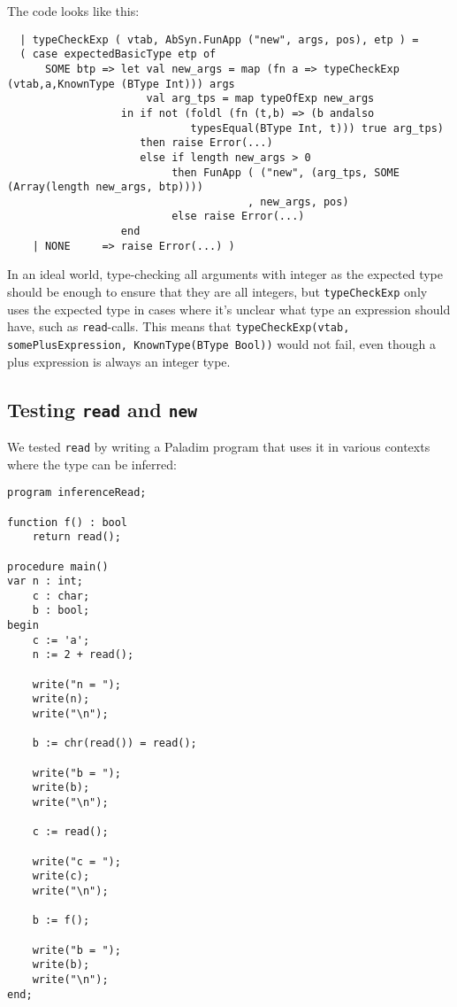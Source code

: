 \documentclass{article}
\begin{document}
The code looks like this:
\begin{lstlisting}
  | typeCheckExp ( vtab, AbSyn.FunApp ("new", args, pos), etp ) =
  ( case expectedBasicType etp of
      SOME btp => let val new_args = map (fn a => typeCheckExp (vtab,a,KnownType (BType Int))) args
                      val arg_tps = map typeOfExp new_args
                  in if not (foldl (fn (t,b) => (b andalso
                             typesEqual(BType Int, t))) true arg_tps)
                     then raise Error(...)
                     else if length new_args > 0
                          then FunApp ( ("new", (arg_tps, SOME (Array(length new_args, btp))))
                                      , new_args, pos)
                          else raise Error(...)
                  end
    | NONE     => raise Error(...) )
\end{lstlisting}

In an ideal world, type-checking all arguments with integer as the expected type should be enough to ensure that they are all integers, but \texttt{typeCheckExp} only uses the expected type in cases where it's unclear what type an expression should have, such as \texttt{read}-calls. This means that \texttt{typeCheckExp(vtab, somePlusExpression, KnownType(BType Bool))} would not fail, even though a plus expression is always an integer type.

\subsection{Testing \texttt{read} and \texttt{new}}
We tested \texttt{read} by writing a Paladim program that uses it in various contexts where the type can be inferred:

\begin{lstlisting}[language=Paladim]
program inferenceRead;

function f() : bool
    return read();

procedure main()
var n : int;
    c : char;
    b : bool;
begin
    c := 'a';
    n := 2 + read();

    write("n = ");
    write(n);
    write("\n");

    b := chr(read()) = read();

    write("b = ");
    write(b);
    write("\n");

    c := read();

    write("c = ");
    write(c);
    write("\n");

    b := f();

    write("b = ");
    write(b);
    write("\n");
end;
\end{lstlisting}
\end{document}
